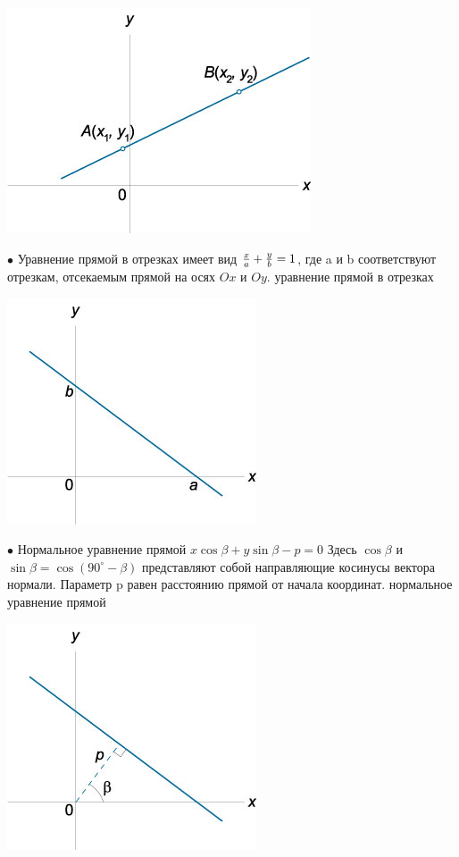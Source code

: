 \documentclass[oneside]{book}
\begin{document}
\begin{enumerate}
\begin{itemize}
\begin{enumerate}
\begin{center}
\includegraphics[scale=0.4]{./pics/6.jpg}
\end{center}

$\bullet$ Уравнение прямой в отрезках имеет вид
$\large\frac{x}{a}\normalsize + \large\frac{y}{b}\normalsize = 1$,
где a и b соответствуют отрезкам, отсекаемым прямой на осях $Ox$ и $Oy$.
уравнение прямой в отрезках
\begin{center}
\includegraphics[scale=0.4]{./pics/7.jpg}
\end{center}

$\bullet$ Нормальное уравнение прямой  
$x\cos \beta + y\sin \beta - p = 0$
Здесь $\cos \beta$ и $\sin\beta = \cos \left( {90^\circ - \beta} \right)$ представляют собой направляющие косинусы вектора нормали. Параметр p равен расстоянию прямой от начала координат.
нормальное уравнение прямой
\begin{center}
\includegraphics[scale=0.4]{./pics/8.jpg}
\end{center}


\end{enumerate}
\end{itemize}
\end{enumerate}
\end{document}
